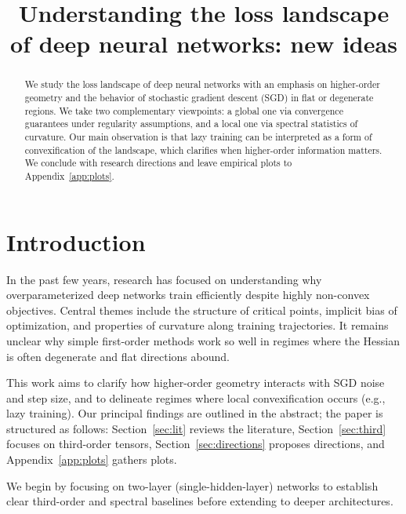 \documentclass[12pt]{article}
\title{Understanding the loss landscape of deep neural networks: new ideas}
\date{}
\begin{document}
\maketitle

\begin{abstract}
We study the loss landscape of deep neural networks with an emphasis on higher-order geometry and the behavior of stochastic gradient descent (SGD) in flat or degenerate regions. We take two complementary viewpoints: a global one via convergence guarantees under regularity assumptions, and a local one via spectral statistics of curvature. Our main observation is that lazy training can be interpreted as a form of convexification of the landscape, which clarifies when higher-order information matters. We conclude with research directions and leave empirical plots to Appendix~\ref{app:plots}.
\end{abstract}

\tableofcontents

\newpage

\section{Introduction}
In the past few years, research has focused on understanding why over\-parameterized deep networks train efficiently despite highly non-convex objectives. Central themes include the structure of critical points, implicit bias of optimization, and properties of curvature along training trajectories. It remains unclear why simple first-order methods work so well in regimes where the Hessian is often degenerate and flat directions abound.

This work aims to clarify how higher-order geometry interacts with SGD noise and step size, and to delineate regimes where local convexification occurs (e.g., lazy training). Our principal findings are outlined in the abstract; the paper is structured as follows: Section~\ref{sec:lit} reviews the literature, Section~\ref{sec:third} focuses on third-order tensors, Section~\ref{sec:directions} proposes directions, and Appendix~\ref{app:plots} gathers plots.

We begin by focusing on two-layer (single-hidden-layer) networks to establish clear third-order and spectral baselines before extending to deeper architectures.
\end{document}
